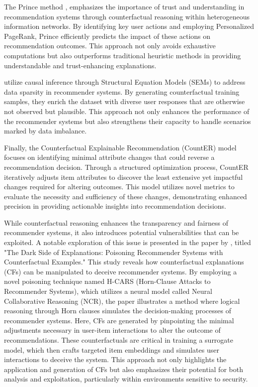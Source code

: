 The Prince method \parencite{ghazimatin_prince_2020}, emphasizes the
importance of trust and understanding in recommendation systems through
counterfactual reasoning within heterogeneous information networks. By identifying
key user actions and employing Personalized PageRank, Prince efficiently
predicts the impact of these actions on recommendation outcomes. This approach not
only avoids exhaustive computations but also outperforms traditional heuristic methods
in providing understandable and trust-enhancing explanations.

\textcite{yang_top-n_2021} utilize causal inference through Structural Equation Models (SEMs)
to address data sparsity in recommender systems. By generating counterfactual training
samples, they enrich the dataset with diverse user responses that are otherwise
not observed but plausible. This approach not only enhances the performance of the
recommender systems but also strengthens their capacity to handle scenarios marked
by data imbalance.

Finally, the Counterfactual Explainable Recommendation (CountER) model \parencite{tan_counterfactual_2021} focuses on identifying minimal attribute changes that could
reverse a recommendation decision. Through a structured optimization process, CountER
iteratively adjusts item attributes to discover the least extensive yet impactful
changes required for altering outcomes. This model utilizes novel metrics to
evaluate the necessity and sufficiency of these changes, demonstrating enhanced precision
in providing actionable insights into recommendation decisions.

While counterfactual reasoning enhances the transparency and fairness of
recommender systems, it also introduces potential vulnerabilities that can be exploited.
A notable exploration of this issue is presented in the paper by \textcite{chen_dark_2023},
titled "The Dark Side of Explanations: Poisoning Recommender Systems with
Counterfactual Examples." This study reveals how counterfactual explanations (CFs)
can be manipulated to deceive recommender systems. By employing a novel poisoning
technique named H-CARS (Horn-Clause Attacks to Recommender Systems), which
utilizes a neural model called Neural Collaborative Reasoning (NCR), the paper illustrates
a method where logical reasoning through Horn clauses simulates the decision-making
processes of recommender systems. Here, CFs are generated by pinpointing the minimal
adjustments necessary in user-item interactions to alter the outcome of recommendations.
These counterfactuals are critical in training a surrogate model, which then crafts
targeted item embeddings and simulates user interactions to deceive the system.
This approach not only highlights the application and generation of CFs but also
emphasizes their potential for both analysis and exploitation, particularly within
environments sensitive to security.

